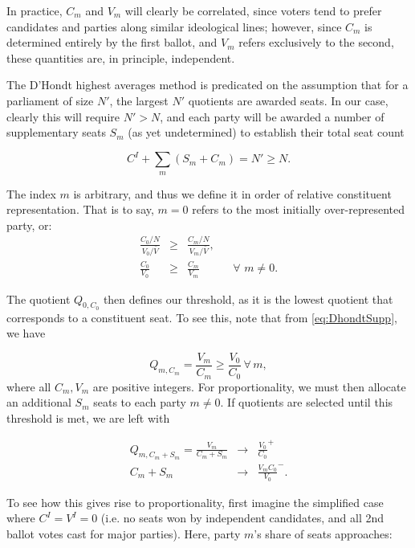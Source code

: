 \documentclass[DIV=calc, paper=a4, fontsize=11pt, twocolumn]{scrartcl}	 %
\begin{document}
In practice, $C_m$ and $V_m$ will clearly be correlated, since voters tend to prefer candidates and parties along similar ideological lines; however, since $C_m$ is determined entirely by the first ballot, and $V_m$ refers exclusively to the second, these quantities are, in principle, independent.

The D'Hondt highest averages method is predicated on the assumption that for a parliament of size $N'$, the largest $N'$ quotients are awarded seats. In our case, clearly this will require $N'>N$, and each party will be awarded a number of supplementary seats $S_m$ (as yet undetermined) to establish their total seat count 

\begin{equation}
\label{eq:sum_Sm}
C^I + \sum_m\left( S_m +C_m\right) = N' \ge N.
\end{equation}



The index $m$ is arbitrary, and thus we define it in order of relative constituent representation. That is to say, $m=0$ refers to the most initially over-represented party, or:
\begin{align}
\label{eq:most_overrep}
\frac{C_0/N}{V_0/\bar{V}} &\ge& \frac{C_m/N}{V_m/\bar{V}}, \\
\frac{C_0}{V_0} &\ge& \frac{C_m}{V_m} && \forall \,\, m \neq 0.
\end{align}

The quotient $Q_{0,C_0}$ then defines our threshold, as it is the lowest quotient that corresponds to a constituent seat. To see this, note that from \ref{eq:DhondtSupp}, we have 

\begin{equation}
\label{eq:QmCm}
Q_{m,C_m} = \frac{V_m}{C_m} \ge \frac{V_0}{C_0} \,  \forall \, m,
\end{equation}
where all $C_m,V_m$ are positive integers. For proportionality, we must then allocate an additional $S_m$ seats to each party $m \neq 0$. If quotients are selected until this threshold is met, we are left with

\begin{align}
\label{eq:QmSm}
Q_{m,C_m+S_m} = \frac{V_m}{C_m+S_m} &\to& \frac{V_0}{C_0}^+ \\ 
{C_m+S_m} &\to& \frac{V_mC_0}{V_0}^-.
\end{align}

To see how this gives rise to proportionality, first imagine the simplified case where $C^I=V^I=0$ (i.e. no seats won by independent candidates, and all 2nd ballot votes cast for major parties). Here, party $m$'s share of seats approaches:
\end{document}
